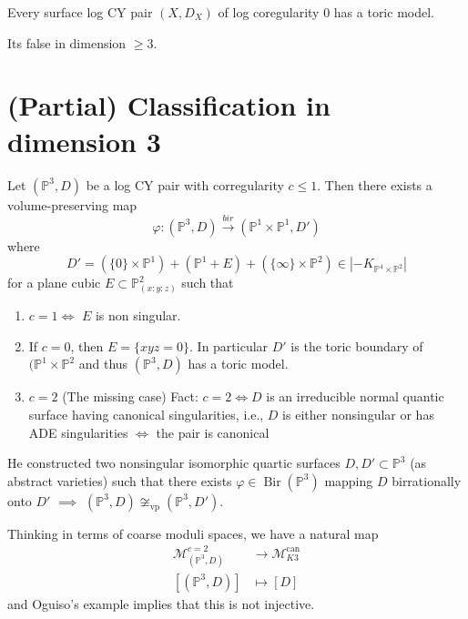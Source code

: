 \begin{thm}\leavevmode
	Every surface log CY pair $(X,D_X)$ of log coregularity 0 has a toric model.
\end{thm}

\begin{remark}
	Its false in dimension $\geq 3$.
\end{remark}

\section{(Partial) Classification in dimension 3}

\begin{thm}[Ducat, 2023]\leavevmode
	Let $(\mathbb{P}^3,D)$ be a log CY pair with corregularity $c\leq 1$. Then there exists a volume-preserving map
	\[\varphi:(\mathbb{P}^3,D)\overset{bir}{\longrightarrow}(\mathbb{P}^1\times \mathbb{P}^1,D') \]
	where
	\[D'=(\{0\} \times \mathbb{P}^1)+(\mathbb{P}^1+E)+(\{\infty\} \times \mathbb{P}^2)\in |-K_{\mathbb{P}^4\times \mathbb{P}^2}|\]
	for a plane cubic $E\subset \mathbb{P}^2_{(x:y:z)}$ such that
	\begin{enumerate}
		\item  $c=1\iff$ $E$ is non singular.

		\item If $c=0$, then $E=\{xyz=0\}$. In particular $D'$ is the toric boundary of $(\mathbb{P}^1\times \mathbb{P}^2$ and thus $(\mathbb{P}^3,D)$ has a toric model.

		\item $c=2$ (The missing case) Fact:  $c=2\iff D$ is an irreducible normal quantic surface having canonical singularities, i.e., $D$ is either nonsingular or has ADE singularities $ \iff$ the pair is canonical
	\end{enumerate}
\end{thm}

\begin{example}
	He constructed two nonsingular isomorphic quartic surfaces $D,D'\subset \mathbb{P}^3$ (as abstract varieties) such that there exists $\varphi \in\operatorname{Bir}(\mathbb{P}^3)$ mapping $D$ birrationally onto $D'$ $\implies $ $(\mathbb{P}^3,D)\not\cong_{\operatorname{vp}} (\mathbb{P}^3,D')$.
\end{example}

	Thinking in terms of coarse moduli spaces, we have a natural map
	\begin{align*}
		\mathcal{M}_{(\mathbb{P}^3,D)}^{c=2}  &\longrightarrow  \mathcal{M}_{K3}^{\operatorname{can}}\\
		[(\mathbb{P}^3,D)] &\longmapsto [D]
	\end{align*}
	and Oguiso's example implies that this is not injective.

